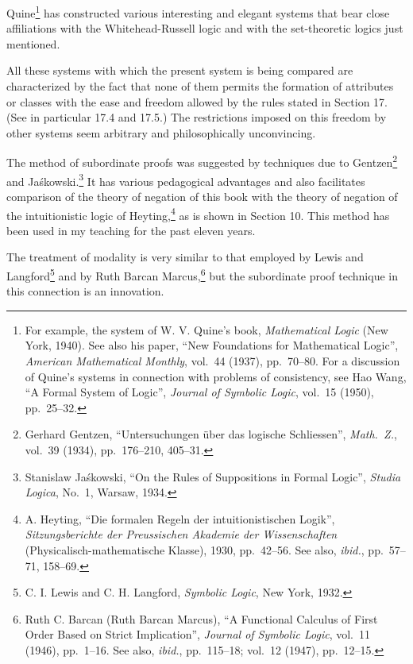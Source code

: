 \documentclass{book}
\let\oldmarginpar\marginpar
\renewcommand*{\marginpar}[1]{\oldmarginpar{\footnotesize#1}}
\begin{document}
Quine\footnote{For example, the system of W. V. Quine's book, \textit{Mathematical Logic} (New York, 1940).  See also his paper, “New Foundations for Mathematical Logic”, \textit{American Mathematical Monthly}, vol.\ 44 (1937), pp.\ 70–80.  For a discussion of Quine's systems in connection with problems of consistency, see Hao Wang, “A Formal System of Logic”, \textit{Journal of Symbolic Logic}, vol.\ 15 (1950), pp.\ 25–32.} has constructed various interesting and elegant systems that bear close affiliations with the Whitehead-Russell logic and with the set-theoretic logics just mentioned.

All these systems with which the present system is being compared are characterized by the fact that none of them permits the formation of attributes or classes with the ease and freedom allowed by the rules stated in Section 17.  (See in particular 17.4 and 17.5.)  The restrictions imposed on this freedom by other systems seem arbitrary and philosophically unconvincing.

The method of subordinate proofs was suggested by techniques due to Gentzen\footnote{Gerhard Gentzen, “Untersuchungen über das logische Schliessen”, \textit{Math.\ Z.}, vol.\ 39 (1934), pp.\ 176–210, 405–31.} and Jaśkowski.\footnote{Stanislaw Jaśkowski, “On the Rules of Suppositions in Formal Logic”, \textit{Studia Logica}, No.\ 1, Warsaw, 1934.}  It has various pedagogical advantages and also facilitates comparison of the theory of negation of this book with the theory of negation of the intuitionistic logic of \marginpar{viii}Heyting,\footnote{A. Heyting, “Die formalen Regeln der intuitionistischen Logik”, \textit{Sitzungsberichte der Preussischen Akademie der Wissenschaften} (Physicalisch-mathematische Klasse), 1930, pp.\ 42–56.  See also, \textit{ibid.}, pp.\ 57–71, 158–69.} as is shown in Section 10.  This method has been used in my teaching for the past eleven years.

The treatment of modality is very similar to that employed by Lewis and Langford\footnote{C. I. Lewis and C. H. Langford, \textit{Symbolic Logic}, New York, 1932.} and by Ruth Barcan Marcus,\footnote{Ruth C. Barcan (Ruth Barcan Marcus), “A Functional Calculus of First Order Based on Strict Implication”, \textit{Journal of Symbolic Logic}, vol.\ 11 (1946), pp.\ 1–16.  See also, \textit{ibid.}, pp.\ 115–18; vol.\ 12 (1947), pp.\ 12–15.} but the subordinate proof technique in this connection is an innovation.
\end{document}
